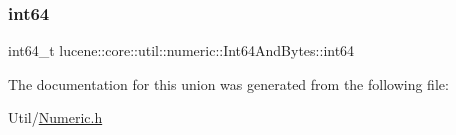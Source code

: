 \subsubsection{\texorpdfstring{int64}{int64}}
{\footnotesize\ttfamily int64\+\_\+t lucene\+::core\+::util\+::numeric\+::\+Int64\+And\+Bytes\+::int64}



The documentation for this union was generated from the following file\+:\begin{DoxyCompactItemize}
\item 
Util/\mbox{\hyperlink{Numeric_8h}{Numeric.\+h}}\end{DoxyCompactItemize}
